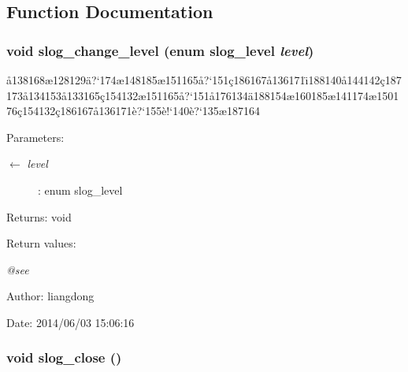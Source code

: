 \subsection{Function Documentation}
\subsubsection{\setlength{\rightskip}{0pt plus 5cm}void slog\_\-change\_\-level (enum slog\_\-level {\em level})}\label{slog_8h_a13}


\aa{}138168\ae{}128129\"{a}?`174\ae{}148185\ae{}151165\aa{}?`151\c{c}186167\aa{}136171\"{\i}188140\aa{}144142\c{c}187173\aa{}134153\aa{}133165\c{c}154132\ae{}151165\aa{}?`151\aa{}176134\"{a}188154\ae{}160185\ae{}141174\ae{}150176\c{c}154132\c{c}186167\aa{}136171\`{e}?`155\`{e}!`140\`{e}?`135\ae{}187164 

\begin{Desc}
\item[Parameters:]
\begin{description}
\item[\mbox{$\leftarrow$} {\em level}]: enum slog\_\-level \end{description}
\end{Desc}
\begin{Desc}
\item[Returns:]void \end{Desc}
\begin{Desc}
\item[Return values:]
\begin{description}
\item[{\em @see}]\end{description}
\end{Desc}
\begin{Desc}
\item[Author:]liangdong \end{Desc}
\begin{Desc}
\item[Date:]2014/06/03 15:06:16 \end{Desc}
\subsubsection{\setlength{\rightskip}{0pt plus 5cm}void slog\_\-close ()}\label{slog_8h_a10}


